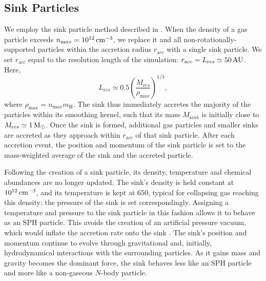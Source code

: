 \documentclass[../thesis.tex]{subfiles}
\begin{document}
\subsection{Sink Particles}
\label{sink_particles}
We employ the sink particle method described in \citet{StacyGreifBromm2010}.  When the density of a gas particle exceeds $n_{\mathrm max} = 10^{12}\,\mathrm{cm}^{-3}$, we replace it and all non-rotationally-supported particles within the accretion radius $r_{\mathrm acc}$ with a single sink particle.  We set $r_{\mathrm acc}$ equal to the resolution length of the simulation: $r_{\mathrm acc} = L_{\mathrm res} \simeq 50\,\mathrm{AU}$.  Here, 
\begin{equation}
L_{\mathrm res} \simeq 0.5 \left( \frac{M_{\mathrm res}}{\rho_{\mathrm max}} \right)^{1/3},
\end{equation}
where $\rho_{\mathrm max} = n_{\mathrm max} m_{\mathrm H}$.  The sink thus immediately accretes the majority of the particles within its smoothing kernel, such that its mass $M_{\mathrm sink}$ is initially close to $M_{\mathrm res} \simeq 1\,\mathrm{M}_{\odot}$. Once the sink is formed, additional gas particles and smaller sinks are accreted as they approach within $r_{\mathrm acc}$ of that sink particle.  After each accretion event, the position and momentum of the sink particle is set to the mass-weighted average of the sink and the accreted particle.

Following the creation of a sink particle, its density, temperature and chemical abundances are no longer updated. The sink's density is held constant at $10^{12}\,\mathrm{cm}^{-3}$, and its temperature is kept at 650\kelvin, typical for collapsing gas reaching this density; the pressure of the sink is set correspondingly. Assigning a temperature and pressure to the sink particle in this fashion allows it to behave as an SPH particle. This  avoids the creation of an artificial pressure vacuum, which would inflate the accretion rate onto the sink \citep[see][]{BrommCoppiLarson2002, MartelEvansShapiro2006}. The sink's position and momentum continue to evolve through gravitational and, initially, hydrodynamical interactions with the surrounding particles. As it gains mass and gravity becomes the dominant force, the sink behaves less like an SPH particle and more like a non-gaseous $N$-body particle.

\end{document}
